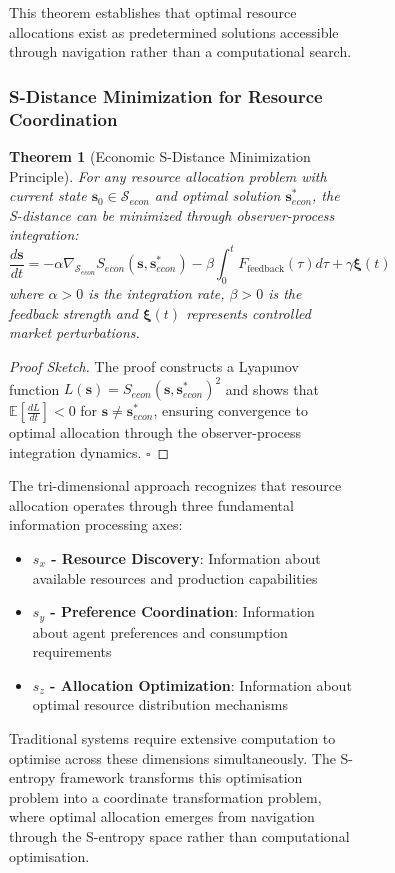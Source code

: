\documentclass[12pt,a4paper]{article}
\newtheorem{theorem}{Theorem}
\begin{document}
\begin{figure}[H]
\begin{figure}[H]
This theorem establishes that optimal resource allocations exist as predetermined solutions accessible through navigation rather than a computational search.

\subsubsection{S-Distance Minimization for Resource Coordination}

\begin{theorem}[Economic S-Distance Minimization Principle]
For any resource allocation problem with current state $\mathbf{s}_0 \in \mathcal{S}_{econ}$ and optimal solution $\mathbf{s}^*_{econ}$, the S-distance can be minimized through observer-process integration:
\begin{equation}
\frac{d\mathbf{s}}{dt} = -\alpha \nabla_{\mathcal{S}_{econ}} S_{econ}(\mathbf{s}, \mathbf{s}^*_{econ}) - \beta \int_0^t F_{\text{feedback}}(\tau) d\tau + \gamma \mathbf{\xi}(t)
\end{equation}
where $\alpha > 0$ is the integration rate, $\beta > 0$ is the feedback strength and $\mathbf{\xi}(t)$ represents controlled market perturbations.
\end{theorem}

\begin{proof}[Proof Sketch]
The proof constructs a Lyapunov function $L(\mathbf{s}) = S_{econ}(\mathbf{s}, \mathbf{s}^*_{econ})^2$ and shows that $\mathbb{E}[\frac{dL}{dt}] < 0$ for $\mathbf{s} \neq \mathbf{s}^*_{econ}$, ensuring convergence to optimal allocation through the observer-process integration dynamics. $\square$
\end{proof}

The tri-dimensional approach recognizes that resource allocation operates through three fundamental information processing axes:
\begin{itemize}
\item \textbf{$s_x$ - Resource Discovery}: Information about available resources and production capabilities
\item \textbf{$s_y$ - Preference Coordination}: Information about agent preferences and consumption requirements  
\item \textbf{$s_z$ - Allocation Optimization}: Information about optimal resource distribution mechanisms
\end{itemize}

Traditional systems require extensive computation to optimise across these dimensions simultaneously. The S-entropy framework transforms this optimisation problem into a coordinate transformation problem, where optimal allocation emerges from navigation through the S-entropy space rather than computational optimisation.


\end{figure}
\end{figure}
\end{document}
